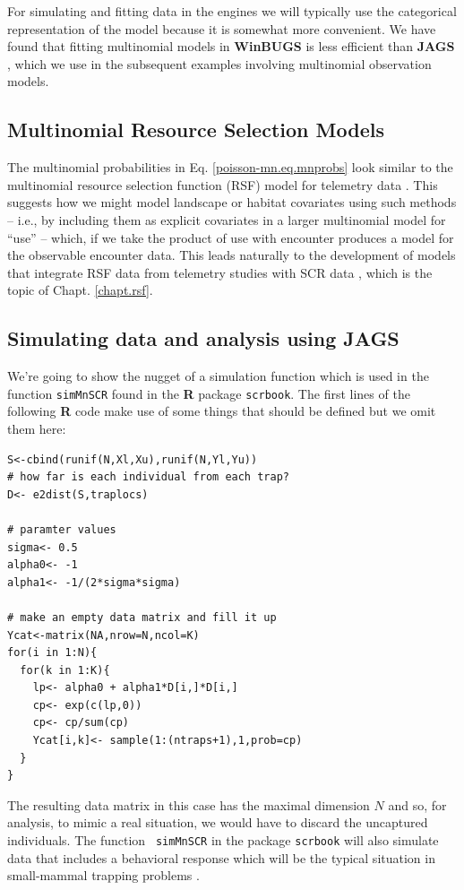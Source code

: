 For simulating and fitting data in the \bugs engines we will typically use
the categorical representation of the model because it is somewhat
more convenient.  We have found that fitting multinomial models in
{\bf WinBUGS} is less efficient than {\bf JAGS}
\citep{converse_royle:2013}, which we use in the subsequent examples
involving multinomial 
observation models.


\subsection{Multinomial  Resource Selection Models}

The multinomial probabilities in Eq. \ref{poisson-mn.eq.mnprobs}
look similar to the 
multinomial resource selection function (RSF) model for telemetry data
\citep{manly_etal:2002, lele_keim:2006}.  This suggests how we might
model landscape or habitat covariates using such methods -- i.e., by
including them as explicit covariates in a larger multinomial model
for ``use'' -- which, if we take the product of use with encounter
produces a model for the observable encounter data. This 
leads naturally to the development of models that integrate RSF data
from telemetry studies with SCR data \citep{royle_chandler:2012},
which is the topic of  Chapt. \ref{chapt.rsf}.





\subsection{Simulating data and analysis using JAGS}

We're going to show the nugget of a simulation function which is
used in the function \mbox{\tt simMnSCR} found in the {\bf R} package
\mbox{\tt scrbook}.  The first lines of the following {\bf R} code
make use of some things that should be defined but we omit them here:
{\small
\begin{verbatim}
S<-cbind(runif(N,Xl,Xu),runif(N,Yl,Yu))
# how far is each individual from each trap?
D<- e2dist(S,traplocs)

# paramter values
sigma<- 0.5
alpha0<- -1
alpha1<- -1/(2*sigma*sigma)

# make an empty data matrix and fill it up
Ycat<-matrix(NA,nrow=N,ncol=K)
for(i in 1:N){
  for(k in 1:K){
    lp<- alpha0 + alpha1*D[i,]*D[i,]
    cp<- exp(c(lp,0))
    cp<- cp/sum(cp)
    Ycat[i,k]<- sample(1:(ntraps+1),1,prob=cp)
  }
}
\end{verbatim}
} 
The resulting data matrix in this case has the maximal dimension $N$
and so, for analysis, to mimic a real situation, we would have to
discard the uncaptured individuals.  The function \mbox{\tt
  simMnSCR} in the package \mbox{\tt scrbook} will also simulate
data that includes a behavioral response
 which will be the
typical situation in small-mammal trapping problems
\citep[see][for details]{converse_royle:2012}.


